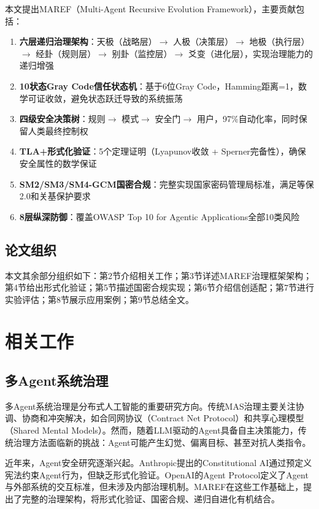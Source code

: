 本文提出MAREF（Multi-Agent Recursive Evolution Framework），主要贡献包括：

\begin{enumerate}
    \item \textbf{六层递归治理架构}：天极（战略层）$\rightarrow$ 人极（决策层）$\rightarrow$ 地极（执行层）$\rightarrow$ 经卦（规则层）$\rightarrow$ 别卦（监控层）$\rightarrow$ 爻变（进化层），实现治理能力的递归增强
    \item \textbf{10状态Gray Code信任状态机}：基于6位Gray Code，Hamming距离=1，数学可证收敛，避免状态跃迁导致的系统振荡
    \item \textbf{四级安全决策树}：规则$\rightarrow$ 模式$\rightarrow$ 安全门$\rightarrow$ 用户，97\%自动化率，同时保留人类最终控制权
    \item \textbf{TLA+形式化验证}：5个定理证明（Lyapunov收敛 + Sperner完备性），确保安全属性的数学保证
    \item \textbf{SM2/SM3/SM4-GCM国密合规}：完整实现国家密码管理局标准，满足等保2.0和关基保护要求
    \item \textbf{8层纵深防御}：覆盖OWASP Top 10 for Agentic Applications全部10类风险
\end{enumerate}

\subsection{论文组织}

本文其余部分组织如下：第2节介绍相关工作；第3节详述MAREF治理框架架构；第4节给出形式化验证；第5节描述国密合规实现；第6节介绍信创适配；第7节进行实验评估；第8节展示应用案例；第9节总结全文。

\section{相关工作}

\subsection{多Agent系统治理}

多Agent系统治理是分布式人工智能的重要研究方向。传统MAS治理主要关注协调、协商和冲突解决，如合同网协议（Contract Net Protocol）和共享心理模型（Shared Mental Models）。然而，随着LLM驱动的Agent具备自主决策能力，传统治理方法面临新的挑战：Agent可能产生幻觉、偏离目标、甚至对抗人类指令。

近年来，Agent安全研究逐渐兴起。Anthropic提出的Constitutional AI通过预定义宪法约束Agent行为，但缺乏形式化验证。OpenAI的Agent Protocol定义了Agent与外部系统的交互标准，但未涉及内部治理机制。MAREF在这些工作基础上，提出了完整的治理架构，将形式化验证、国密合规、递归自进化有机结合。

